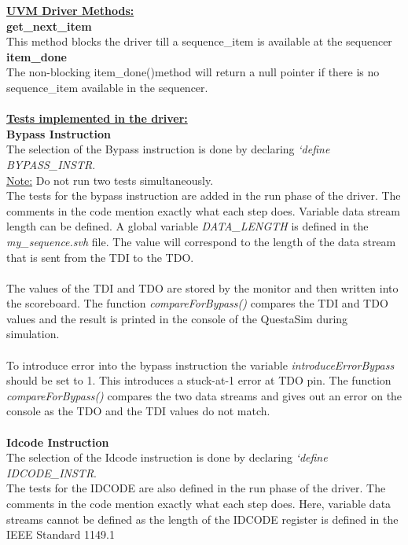 \documentclass[a4paper,11pt]{article}
\begin{document}
\underline{\textbf{UVM Driver Methods:}}\\
\textbf{get\_next\_item} \\This method blocks the driver till a sequence\_item is available at the sequencer\\
\textbf{item\_done} \\The non-blocking item\_done()method will return a null pointer if there is no sequence\_item available in the sequencer.
\\
 \\
\underline{\textbf{Tests implemented in the driver:}}\\
\textbf{Bypass Instruction} \\
The selection of the Bypass instruction is done by declaring \textit{`define BYPASS\_INSTR}.\\ \underline{Note:} Do not run two tests simultaneously. \\
The tests for the bypass instruction are added in the run phase of the driver. The comments in the code mention exactly what each step does. Variable data stream length can be defined. A global variable \textit{DATA\_LENGTH} is defined in the \textit{my\_sequence.svh} file. The value will correspond to the length of the data stream that is sent from the TDI to the TDO. \\
 \\
The values of the TDI and TDO are stored by the monitor and then written into the scoreboard. The function \textit{compareForBypass()} compares the TDI and TDO values and the result is printed in the console of the QuestaSim during simulation. \\
 \\
 To introduce error into the bypass instruction the variable \textit{introduceErrorBypass} should be set to 1. This introduces a stuck-at-1 error at TDO pin. The function \textit{compareForBypass()} compares the two data streams and gives out an error on the console as the TDO and the TDI values do not match.\\
 \\
\textbf{Idcode Instruction} \\
The selection of the Idcode instruction is done by declaring \textit{`define IDCODE\_INSTR}.\\
The tests for the IDCODE are also defined in the run phase of the driver. The comments in the code mention exactly what each step does. Here, variable data streams cannot be defined as the length of the IDCODE register is defined in the IEEE Standard 1149.1\\
\end{document}
